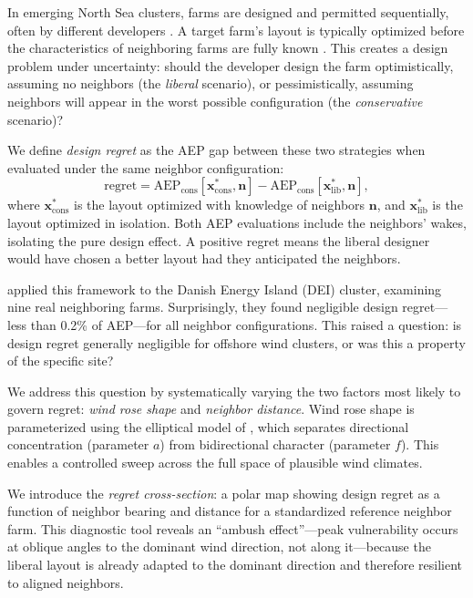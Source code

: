 \documentclass[manuscript, 12pt]{copernicus}
\begin{document}
In emerging North Sea clusters, farms are designed and permitted sequentially, often by different developers \citep{Fischereit2022, Fliegner2025}.
A target farm's layout is typically optimized before the characteristics of neighboring farms are fully known \citep{Quick2026omae}.
This creates a design problem under uncertainty: should the developer design the farm optimistically, assuming no neighbors (the \emph{liberal} scenario), or pessimistically, assuming neighbors will appear in the worst possible configuration (the \emph{conservative} scenario)?

We define \emph{design regret} as the AEP gap between these two strategies when evaluated under the same neighbor configuration:
\begin{equation}\label{eq:regret}
    \text{regret} = \text{AEP}_\text{cons}[\mathbf{x}^*_\text{cons}, \mathbf{n}] - \text{AEP}_\text{cons}[\mathbf{x}^*_\text{lib}, \mathbf{n}],
\end{equation}
where $\mathbf{x}^*_\text{cons}$ is the layout optimized with knowledge of neighbors $\mathbf{n}$, and $\mathbf{x}^*_\text{lib}$ is the layout optimized in isolation.
Both AEP evaluations include the neighbors' wakes, isolating the pure design effect.
A positive regret means the liberal designer would have chosen a better layout had they anticipated the neighbors.

\citet{Quick2026omae} applied this framework to the Danish Energy Island (DEI) cluster, examining nine real neighboring farms.
Surprisingly, they found negligible design regret---less than 0.2\% of AEP---for all neighbor configurations.
This raised a question: is design regret generally negligible for offshore wind clusters, or was this a property of the specific site?

We address this question by systematically varying the two factors most likely to govern regret: \emph{wind rose shape} and \emph{neighbor distance}.
Wind rose shape is parameterized using the elliptical model of \citet{Hart2025}, which separates directional concentration (parameter $a$) from bidirectional character (parameter $f$).
This enables a controlled sweep across the full space of plausible wind climates.

We introduce the \emph{regret cross-section}: a polar map showing design regret as a function of neighbor bearing and distance for a standardized reference neighbor farm.
This diagnostic tool reveals an ``ambush effect''---peak vulnerability occurs at oblique angles to the dominant wind direction, not along it---because the liberal layout is already adapted to the dominant direction and therefore resilient to aligned neighbors.
\end{document}
